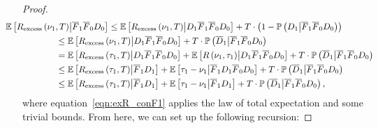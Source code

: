 \documentclass[twoside]{article}
\def\eqref#1{equation~\ref{#1}}
\newcommand{\E}{\mathbb{E}}
\theoremstyle{plain}
\theoremstyle{definition}
\theoremstyle{remark}
\begin{document}
\begin{proof}
    \begin{subequations}
        \begin{align}
            \hspace{-20pt}\E\left[R_{\mathrm{excess}}\left(\nu_{1},T\right)\middle| \overline{F}_{1}\overline{F}_{0}D_{0}\right] 
            &\leq\E\left[R_{\mathrm{excess}}\left(\nu_{1},T\right)\middle| D_{1}\overline{F}_{1}\overline{F}_{0}D_{0}\right]+T\cdot \left(1-\mathbb{P}\left(D_{1}\middle| \overline{F}_{1}\overline{F}_{0}D_{0}\right)\right)\label{eqn:exR_conF1}\\
            &\hspace{-60pt}\leq \E\left[R_{\mathrm{excess}}\left(\nu_{1},T\right)\middle| D_{1}\overline{F}_{1}\overline{F}_{0}D_{0}\right] + T\cdot\mathbb{P}\left(\overline{D}_{1}\middle| \overline{F}_{1}\overline{F}_{0}D_{0}\right)\label{eqn:exR_conF2}\\     
            &\hspace{-60pt}= \E\left[R_{\mathrm{excess}}\left(\tau_{1},T\right)\middle| D_{1}\overline{F}_{1}\overline{F}_{0}D_{0}\right]+\E\left[R\left(\nu_{1},\tau_{1}\right)\middle| D_{1}\overline{F}_{1}\overline{F}_{0}D_{0}\right]+T\cdot\mathbb{P}\left(\overline{D}_{1}\middle| \overline{F}_{1}\overline{F}_{0}D_{0}\right)\label{eqn:exreg_split1}\\
            &\hspace{-60pt}\leq\E\left[R_{\mathrm{excess}}\left(\tau_{1},T\right)\middle| \overline{F}_{1}D_{1}\right] + \E\left[\tau_{1}-\nu_{1}\middle| \overline{F}_{1}D_{1}\overline{F}_{0}D_{0}\right]\label{eqn:reg_split2}+T\cdot\mathbb{P}\left(\overline{D}_{1}\middle| \overline{F}_{1}\overline{F}_{0}D_{0}\right)\\
            &\hspace{-60pt}\leq\E\left[R_{\mathrm{excess}}\left(\tau_{1},T\right)\middle| \overline{F}_{1}D_{1}\right] + \E\left[\tau_{1}-\nu_{1}\middle| \overline{F}_{1}D_{1}\right]+T\cdot\mathbb{P}\left(\overline{D}_{1}\middle| \overline{F}_{1}\overline{F}_{0}D_{0}\right)\label{eqn:exreg_split3},
        \end{align}
    \end{subequations}
    where \eqref{eqn:exR_conF1} applies the law of total expectation and some trivial bounds. 
    From here, we can set up the following recursion:


\end{proof}
\end{document}
